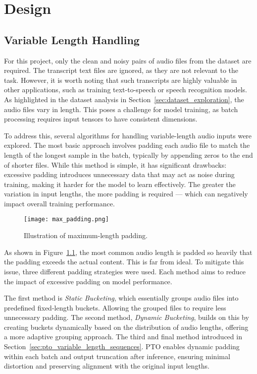 \graphicspath{{content/chapters/5_design/figures/}}
\chapter{Design}
\label{chp:design}

\section{Variable Length Handling}
\label{sec:variable_length_handling}

For this project, only the clean and noisy pairs of audio files from the dataset are required. The transcript text files are ignored, as they are not relevant to the task. However, it is worth noting that such transcripts are highly valuable in other applications, such as training text-to-speech or speech recognition models. As highlighted in the dataset analysis in Section~\ref{sec:dataset_exploration}, the audio files vary in length. This poses a challenge for model training, as batch processing requires input tensors to have consistent dimensions.

To address this, several algorithms for handling variable-length audio inputs were explored. The most basic approach involves padding each audio file to match the length of the longest sample in the batch, typically by appending zeros to the end of shorter files. While this method is simple, it has significant drawbacks: excessive padding introduces unnecessary data that may act as noise during training, making it harder for the model to learn effectively. The greater the variation in input lengths, the more padding is required — which can negatively impact overall training performance.

\begin{figure}[h]
    \centering
    \texttt{[image: max\_padding.png]}
    \caption{\label{fig:max_padding}Illustration of maximum-length padding.}
\end{figure}

As shown in Figure~\ref{fig:max_padding}, the most common audio length is padded so heavily that the padding exceeds the actual content. This is far from ideal. To mitigate this issue, three different padding strategies were used. Each method aims to reduce the impact of excessive padding on model performance.

The first method is \textit{Static Bucketing}, which essentially groups audio files into predefined fixed-length buckets. Allowing the grouped files to require less unnecessary padding. The second method, \textit{Dynamic Bucketing}, builds on this by creating buckets dynamically based on the distribution of audio lengths, offering a more adaptive grouping approach. The third and final method introduced in Section~\ref{sec:pto_variable_length_sequences}. PTO enables dynamic padding within each batch and output truncation after inference, ensuring minimal distortion and preserving alignment with the original input lengths.

